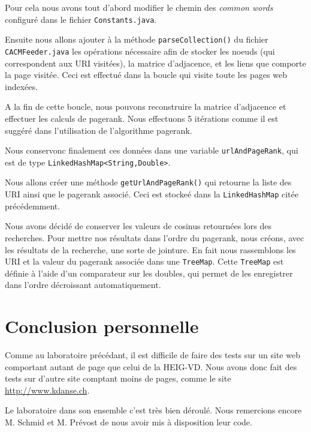 \documentclass[a4paper, 11pt]{article}
\begin{document}
Pour cela nous avons tout d'abord modifier le chemin des
\textit{common words} configuré dans le fichier \texttt{Constants.java}. 

Ensuite nous allons ajouter à la méthode \texttt{parseCollection()} du fichier \texttt{CACMFeeder.java} les opérations nécessaire afin de stocker les noeuds (qui correspondent aux URI visitées), la matrice d'adjacence, et les liens que comporte la page visitée. Ceci est effectué dans la boucle qui visite toute les pages web indexées.

A la fin de cette boucle, nous pouvons reconstruire la matrice d'adjacence et effectuer les calculs de pagerank. Nous effectuons 5 itérations comme il est suggéré dans l'utilisation de l'algorithme pagerank.

Nous conservonc finalement ces données dans une variable \texttt{urlAndPageRank}, qui est de type \texttt{LinkedHashMap<String,Double>}. 

Nous allons créer une méthode \texttt{getUrlAndPageRank()} qui retourne la liste des URI ainsi que le pagerank associé. Ceci est stockeé dans la \texttt{LinkedHashMap} citée précédemment.

Nous avons décidé de conserver les valeurs de cosinus retournées lors des recherches. Pour mettre nos résultats dans l'ordre du pagerank, nous créons, avec les résultats de la recherche, une sorte de jointure. En fait nous rassemblons les URI et la valeur du pagerank associée dans une \texttt{TreeMap}. Cette \texttt{TreeMap} est définie à l'aide d'un comparateur sur les doubles, qui permet de les enregistrer dans l'ordre décroissant automatiquement.

\section{Conclusion personnelle} 

Comme au laboratoire précédant, il est difficile de faire des tests sur un site
web comportant autant de page que celui de la HEIG-VD. Nous avons donc fait des
tests sur d'autre site comptant moins de pages, comme le site
\url{http://www.kdanse.ch}.

Le laboratoire dans son ensemble c'est très bien déroulé. Nous remercions encore M. Schmid et M. Prévost de nous avoir mis à disposition leur code.



\end{document}
